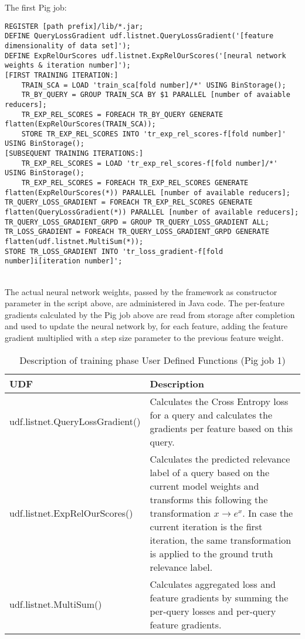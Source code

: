 The first Pig job:\\
\begin{minipage}{\linewidth}
\begin{lstlisting}
REGISTER [path prefix]/lib/*.jar;
DEFINE QueryLossGradient udf.listnet.QueryLossGradient('[feature dimensionality of data set]');
DEFINE ExpRelOurScores udf.listnet.ExpRelOurScores('[neural network weights & iteration number]');
[FIRST TRAINING ITERATION:]
	TRAIN_SCA = LOAD 'train_sca[fold number]/*' USING BinStorage();
	TR_BY_QUERY = GROUP TRAIN_SCA BY $1 PARALLEL [number of avaiable reducers];
	TR_EXP_REL_SCORES = FOREACH TR_BY_QUERY GENERATE flatten(ExpRelOurScores(TRAIN_SCA));
	STORE TR_EXP_REL_SCORES INTO 'tr_exp_rel_scores-f[fold number]' USING BinStorage();
[SUBSEQUENT TRAINING ITERATIONS:]
	TR_EXP_REL_SCORES = LOAD 'tr_exp_rel_scores-f[fold number]/*' USING BinStorage();
	TR_EXP_REL_SCORES = FOREACH TR_EXP_REL_SCORES GENERATE flatten(ExpRelOurScores(*)) PARALLEL [number of available reducers];
TR_QUERY_LOSS_GRADIENT = FOREACH TR_EXP_REL_SCORES GENERATE flatten(QueryLossGradient(*)) PARALLEL [number of available reducers];
TR_QUERY_LOSS_GRADIENT_GRPD = GROUP TR_QUERY_LOSS_GRADIENT ALL;
TR_LOSS_GRADIENT = FOREACH TR_QUERY_LOSS_GRADIENT_GRPD GENERATE flatten(udf.listnet.MultiSum(*));
STORE TR_LOSS_GRADIENT INTO 'tr_loss_gradient-f[fold number]i[iteration number]';
\end{lstlisting}
\end{minipage}\\

The actual neural network weights, passed by the framework as constructor parameter in the script above, are administered in Java code. The per-feature gradients calculated by the Pig job above are read from storage after completion and used to update the neural network by, for each feature, adding the feature gradient multiplied with a step size parameter to the previous feature weight.

\begin{table}
\centering
\begin{tabular}{p{6cm}p{7cm}}\toprule
UDF & Description \\
\midrule
udf.listnet.QueryLossGradient() & Calculates the Cross Entropy loss for a query and calculates the gradients per feature based on this query.\\
udf.listnet.ExpRelOurScores() & Calculates the predicted relevance label of a query based on the current model weights and transforms this following the transformation $x \rightarrow e^{x}$. In case the current iteration is the first iteration, the same transformation is applied to the ground truth relevance label.\\
udf.listnet.MultiSum() & Calculates aggregated loss and feature gradients by summing the per-query losses and per-query feature gradients.\\
\bottomrule
\end{tabular}
\caption{Description of training phase User Defined Functions (Pig job 1)}
\label{tbl:training_udfs_1}
\end{table}

